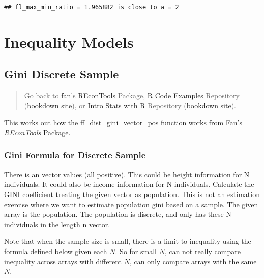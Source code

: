 \documentclass[
]{book}
\begin{document}
\begin{verbatim}
## fl_max_min_ratio = 1.965882 is close to a = 2
\end{verbatim}

\hypertarget{inequality-models}{%
\section{Inequality Models}\label{inequality-models}}

\hypertarget{gini-discrete-sample}{%
\subsection{Gini Discrete Sample}\label{gini-discrete-sample}}

\begin{quote}
Go back to \href{http://fanwangecon.github.io/}{fan}'s \href{https://fanwangecon.github.io/REconTools/}{REconTools} Package, \href{https://fanwangecon.github.io/R4Econ/}{R Code Examples} Repository (\href{https://fanwangecon.github.io/R4Econ/bookdown}{bookdown site}), or \href{https://fanwangecon.github.io/Stat4Econ/}{Intro Stats with R} Repository (\href{https://fanwangecon.github.io/Stat4Econ/bookdown}{bookdown site}).
\end{quote}

This works out how the \href{https://fanwangecon.github.io/REconTools/reference/ff_dist_gini_vector_pos.html}{ff\_dist\_gini\_vector\_pos} function works from \href{https://fanwangecon.github.io/}{Fan}'s \emph{\href{https://fanwangecon.github.io/REconTools/}{REconTools}} Package.

\hypertarget{gini-formula-for-discrete-sample}{%
\subsubsection{Gini Formula for Discrete Sample}\label{gini-formula-for-discrete-sample}}

There is an vector values (all positive). This could be height information for N individuals. It could also be income information for N individuals. Calculate the \href{https://en.wikipedia.org/wiki/Gini_coefficient}{GINI} coefficient treating the given vector as population. This is not an estimation exercise where we want to estimate population gini based on a sample. The given array is the population. The population is discrete, and only has these N individuals in the length n vector.

Note that when the sample size is small, there is a limit to inequality using the formula defined below given each \(N\). So for small \(N\), can not really compare inequality across arrays with different \(N\), can only compare arrays with the same \(N\).
\end{document}
